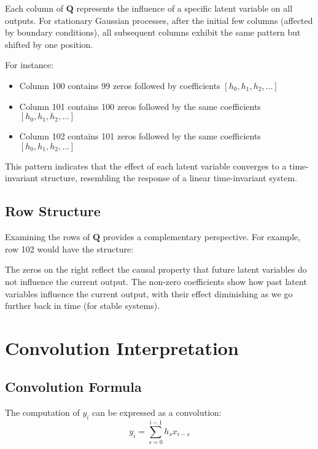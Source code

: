\documentclass{article}
\begin{document}
Each column of $\mathbf{Q}$ represents the influence of a specific latent variable on all outputs. For stationary Gaussian processes, after the initial few columns (affected by boundary conditions), all subsequent columns exhibit the same pattern but shifted by one position.

For instance:
\begin{itemize}
    \item Column 100 contains 99 zeros followed by coefficients $[h_0, h_1, h_2, \ldots]$
    \item Column 101 contains 100 zeros followed by the same coefficients $[h_0, h_1, h_2, \ldots]$
    \item Column 102 contains 101 zeros followed by the same coefficients $[h_0, h_1, h_2, \ldots]$
\end{itemize}

This pattern indicates that the effect of each latent variable converges to a time-invariant structure, resembling the response of a linear time-invariant system.

\subsection{Row Structure}

Examining the rows of $\mathbf{Q}$ provides a complementary perspective. For example, row 102 would have the structure:
\begin{equation}
[h_{102}, h_{101}, h_{100}, \ldots, h_1, h_0, 0, 0, \ldots, 0]
\end{equation}

The zeros on the right reflect the causal property that future latent variables do not influence the current output. The non-zero coefficients show how past latent variables influence the current output, with their effect diminishing as we go further back in time (for stable systems).

\section{Convolution Interpretation}

\subsection{Convolution Formula}

The computation of $y_i$ can be expressed as a convolution:
\begin{equation}
y_i = \sum_{s=0}^{i-1} h_s x_{i-s}
\end{equation}
\end{document}
